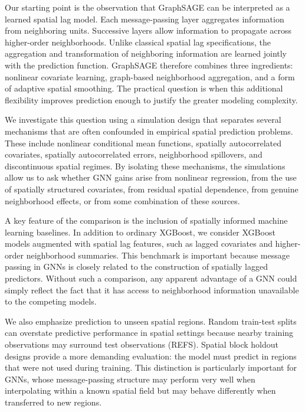 \documentclass[ASNA, twocolumn]{USG} %
\begin{document}
Our starting point is the observation that GraphSAGE can be interpreted as a learned spatial lag model. Each message-passing layer aggregates information from neighboring units. Successive layers allow information to propagate across higher-order neighborhoods. Unlike classical spatial lag specifications, the aggregation and transformation of neighboring information are learned jointly with the prediction function. GraphSAGE therefore combines three ingredients: nonlinear covariate learning, graph-based neighborhood aggregation, and a form of adaptive spatial smoothing. The practical question is when this additional flexibility improves prediction enough to justify the greater modeling complexity.

We investigate this question using a simulation design that separates several mechanisms that are often confounded in empirical spatial prediction problems. These include nonlinear conditional mean functions, spatially autocorrelated covariates, spatially autocorrelated errors, neighborhood spillovers, and discontinuous spatial regimes. By isolating these mechanisms, the simulations allow us to ask whether GNN gains arise from nonlinear regression, from the use of spatially structured covariates, from residual spatial dependence, from genuine neighborhood effects, or from some combination of these sources.

A key feature of the comparison is the inclusion of spatially informed machine learning baselines. In addition to ordinary XGBoost, we consider XGBoost models augmented with spatial lag features, such as lagged covariates and higher-order neighborhood summaries. This benchmark is important because message passing in GNNs is closely related to the construction of spatially lagged predictors. Without such a comparison, any apparent advantage of a GNN could simply reflect the fact that it has access to neighborhood information unavailable to the competing models.

We also emphasize prediction to unseen spatial regions. Random train-test splits can overstate predictive performance in spatial settings because nearby training observations may surround test observations (REFS). Spatial block holdout designs provide a more demanding evaluation: the model must predict in regions that were not used during training. This distinction is particularly important for GNNs, whose message-passing structure may perform very well when interpolating within a known spatial field but may behave differently when transferred to new regions.
\end{document}
